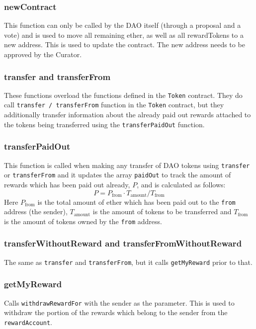 \documentclass[9pt,oneside]{amsart}
\begin{document}
\begin{multicols}{2}
\subsubsection*{newContract}
This function can only be called by the DAO itself (through a proposal and a vote) and is used to move all remaining ether, as well as all rewardTokens to a new address. This is used to update the contract. The new address needs to be approved by the Curator.

\subsubsection*{transfer and transferFrom}
These functions overload the functions defined in the \verb|Token| contract. They do call \verb|transfer / transferFrom| function in the \verb|Token| contract, but they additionally transfer information about the already paid out rewards attached to the tokens being transferred using the \verb|transferPaidOut| function. 

\subsubsection*{transferPaidOut}
This function is called when making any transfer of DAO tokens using \verb|transfer| or \verb|transferFrom| and it updates the array \verb|paidOut| to track the amount of rewards which has been paid out already, $P$, and is calculated as follows:
\begin{equation}
 P = P_{\text{from}} \cdot T_{\text{amount}} / T_{\text{from}}
\end{equation}
Here $P_{\text{from}}$ is the total amount of ether which has been paid out to the \verb|from| address (the sender), $T_{\text{amount}}$ is the amount of tokens to be transferred and $T_{\text{from}}$ is the amount of tokens owned by the \verb|from| address.

\subsubsection*{transferWithoutReward and transferFromWithoutReward}
The same as \verb|transfer| and \verb|transferFrom|, but it calls \verb|getMyReward| prior to that.

\subsubsection*{getMyReward}
Calls \verb|withdrawRewardFor| with the sender as the parameter. This is used to withdraw the portion of the rewards which belong to the sender from the \verb|rewardAccount|.


\end{multicols}
\end{document}
